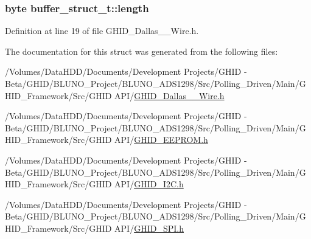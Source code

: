 \hypertarget{structbuffer__struct__t_a812251f18d1b5b93fed46984ed8d7cf1}{
\subsubsection[{length}]{\setlength{\rightskip}{0pt plus 5cm}byte {\bf buffer\-\_\-struct\-\_\-t\-::length}}}\label{structbuffer__struct__t_a812251f18d1b5b93fed46984ed8d7cf1}


\-Definition at line 19 of file \-G\-H\-I\-D\-\_\-\-Dallas\-\_\-\_\-\-Wire.\-h.



\-The documentation for this struct was generated from the following files\-:\begin{DoxyCompactItemize}
\item 
/\-Volumes/\-Data\-H\-D\-D/\-Documents/\-Development Projects/\-G\-H\-I\-D -\/ Beta/\-G\-H\-I\-D/\-B\-L\-U\-N\-O\-\_\-\-Project/\-B\-L\-U\-N\-O\-\_\-\-A\-D\-S1298/\-Src/\-Polling\-\_\-\-Driven/\-Main/\-G\-H\-I\-D\-\_\-\-Framework/\-Src/\-G\-H\-I\-D A\-P\-I/\hyperlink{_g_h_i_d___dallas__1___wire_8h}{\-G\-H\-I\-D\-\_\-\-Dallas\-\_\-\_\-\-Wire.\-h}\item 
/\-Volumes/\-Data\-H\-D\-D/\-Documents/\-Development Projects/\-G\-H\-I\-D -\/ Beta/\-G\-H\-I\-D/\-B\-L\-U\-N\-O\-\_\-\-Project/\-B\-L\-U\-N\-O\-\_\-\-A\-D\-S1298/\-Src/\-Polling\-\_\-\-Driven/\-Main/\-G\-H\-I\-D\-\_\-\-Framework/\-Src/\-G\-H\-I\-D A\-P\-I/\hyperlink{_g_h_i_d___e_e_p_r_o_m_8h}{\-G\-H\-I\-D\-\_\-\-E\-E\-P\-R\-O\-M.\-h}\item 
/\-Volumes/\-Data\-H\-D\-D/\-Documents/\-Development Projects/\-G\-H\-I\-D -\/ Beta/\-G\-H\-I\-D/\-B\-L\-U\-N\-O\-\_\-\-Project/\-B\-L\-U\-N\-O\-\_\-\-A\-D\-S1298/\-Src/\-Polling\-\_\-\-Driven/\-Main/\-G\-H\-I\-D\-\_\-\-Framework/\-Src/\-G\-H\-I\-D A\-P\-I/\hyperlink{_g_h_i_d___i2_c_8h}{\-G\-H\-I\-D\-\_\-\-I2\-C.\-h}\item 
/\-Volumes/\-Data\-H\-D\-D/\-Documents/\-Development Projects/\-G\-H\-I\-D -\/ Beta/\-G\-H\-I\-D/\-B\-L\-U\-N\-O\-\_\-\-Project/\-B\-L\-U\-N\-O\-\_\-\-A\-D\-S1298/\-Src/\-Polling\-\_\-\-Driven/\-Main/\-G\-H\-I\-D\-\_\-\-Framework/\-Src/\-G\-H\-I\-D A\-P\-I/\hyperlink{_g_h_i_d___s_p_i_8h}{\-G\-H\-I\-D\-\_\-\-S\-P\-I.\-h}\end{DoxyCompactItemize}
